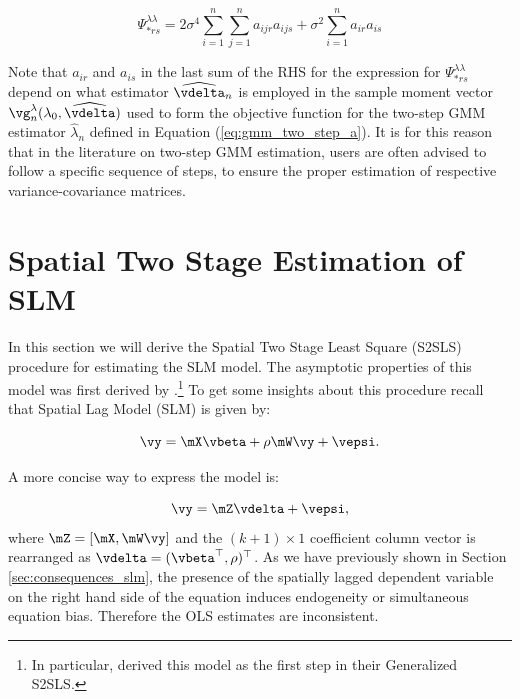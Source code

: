 \documentclass[english,12pt]{book}\usepackage[]{graphicx}\usepackage[]{xcolor}
\begin{document}
\begin{equation*}
\Psi_{*rs}^{\lambda\lambda} = 2\sigma^4\sum_{i = 1} ^n \sum_{j = 1} ^n a_{ijr}a_{ijs} + \sigma^2\sum_{i=1}^n a_{ir}a_{is}
\end{equation*}

Note that $a_{ir}$ and $a_{is}$ in the last sum of the RHS for the expression for $\Psi_{*rs}^{\lambda\lambda}$ depend on what estimator $\widehat{\vdelta}_n$ is employed in the sample moment vector $\vg_n^{\lambda}(\lambda_0, \widehat{\vdelta})$ used to form the objective function for the two-step GMM estimator $\widehat{\lambda}_n$ defined in Equation (\ref{eq:gmm_two_step_a}). It is for this reason that in the literature on two-step GMM estimation, users are often advised to follow a specific sequence of steps, to ensure the proper estimation of respective variance-covariance matrices. 


\section{Spatial Two Stage Estimation of SLM}

In this section we will derive the Spatial Two Stage Least Square (S2SLS) procedure for estimating the SLM model. The asymptotic properties of this model was first derived by \cite{kelejian1998generalized}.\footnote{In particular, \cite{kelejian1998generalized} derived this model as the first step in their Generalized S2SLS.} To get some insights about this procedure recall that Spatial Lag Model (SLM) is given by:

\begin{equation*}
  \vy =   \mX\vbeta + \rho\mW\vy + \vepsi.
\end{equation*}

A more concise way to express the model is:

\begin{equation*}
  \vy = \mZ \vdelta + \vepsi,
\end{equation*}
%
where $\mZ = \left[\mX, \mW\vy\right]$ and the $(k + 1)\times 1$ coefficient column vector is rearranged as  $\vdelta = (\vbeta^\top, \rho)^\top$. As we have previously shown in Section \ref{sec:consequences_slm}, the presence of the spatially lagged dependent variable on the right hand side of the equation induces endogeneity or simultaneous equation bias. Therefore the OLS estimates are inconsistent.
\end{document}
